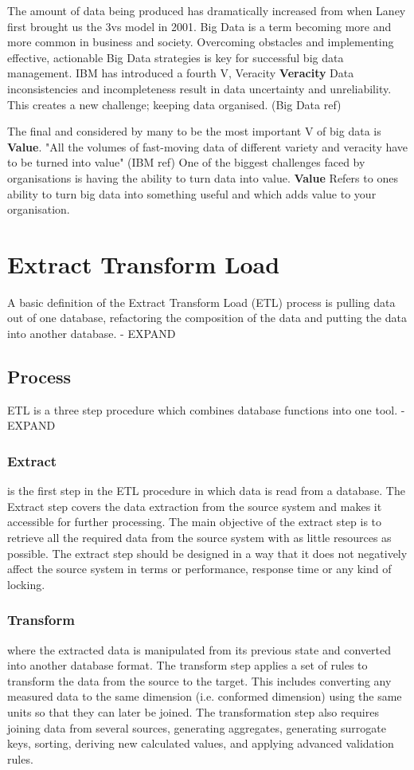 The amount of data being produced has dramatically increased from when Laney first brought us the 3vs model in 2001. Big Data is a term becoming more and more common in business and society. Overcoming obstacles and implementing effective, actionable Big Data strategies is key for successful big data management. IBM has introduced a fourth V, Veracity \textbf{Veracity} Data inconsistencies and incompleteness result in data uncertainty and unreliability. This creates a new challenge; keeping data organised. (Big Data ref)

The final and considered by many to be the most important V of big data is \textbf{Value}. "All the volumes of fast-moving data of different variety and veracity have to be turned into value" (IBM ref) One of the biggest challenges faced by organisations is having the ability to turn data into value. \textbf{Value} Refers to ones ability to turn big data into something useful and which adds value to your organisation.

\section{Extract Transform Load}\label{etl}
A basic definition of the Extract Transform Load (ETL) process is pulling data out of one database, refactoring the composition of the data and putting the data into another database. - EXPAND

\subsection{Process}
ETL is a three step procedure which combines database functions into one tool. - EXPAND

\subsubsection{Extract} is the first step in the ETL procedure in which data is read from a database. The Extract step covers the data extraction from the source system and makes it accessible for further processing. The main objective of the extract step is to retrieve all the required data from the source system with as little resources as possible. The extract step should be designed in a way that it does not negatively affect the source system in terms or performance, response time or any kind of locking.

\subsubsection{Transform} where the extracted data is manipulated from its previous state and converted into another database format. The transform step applies a set of rules to transform the data from the source to the target. This includes converting any measured data to the same dimension (i.e. conformed dimension) using the same units so that they can later be joined. The transformation step also requires joining data from several sources, generating aggregates, generating surrogate keys, sorting, deriving new calculated values, and applying advanced validation rules.

